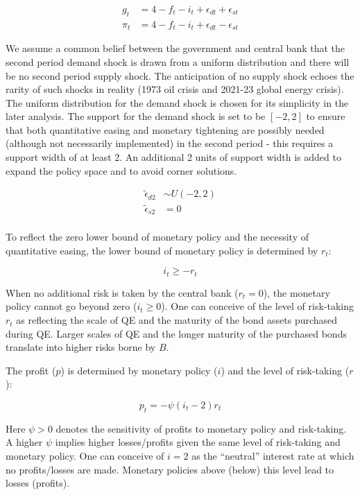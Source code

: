 \documentclass[
  a4paper,
  abstract=true]{scrartcl}
\theoremstyle{definition}
\begin{document}
\begin{align*} g_t &= 4-f_t-i_t+\epsilon_{dt}+\epsilon_{st}\\ \pi_t &= 4-f_t-i_t+\epsilon_{dt}-\epsilon_{st} \end{align*}

We assume a common belief between the government and central bank that
the second period demand shock is drawn from a uniform distribution and
there will be no second period supply shock. The anticipation of no
supply shock echoes the rarity of such shocks in reality (1973 oil
crisis and 2021-23 global energy crisis). The uniform distribution for
the demand shock is chosen for its simplicity in the later analysis. The
support for the demand shock is set to be \([-2,2]\) to ensure that both
quantitative easing and monetary tightening are possibly needed
(although not necessarily implemented) in the second period - this
requires a support width of at least 2. An additional 2 units of support
width is added to expand the policy space and to avoid corner solutions.

\begin{align*}
\tilde\epsilon_{d2} &\sim U(-2, 2) \\
\tilde\epsilon_{s2}&=0 \\
\end{align*}

To reflect the zero lower bound of monetary policy and the necessity of
quantitative easing, the lower bound of monetary policy is determined by
\(r_t\):

\[
i_t\geq-r_t
\]

When no additional risk is taken by the central bank (\(r_t=0\)), the
monetary policy cannot go beyond zero (\(i_t\geq0\)). One can conceive
of the level of risk-taking \(r_t\) as reflecting the scale of QE and
the maturity of the bond assets purchased during QE. Larger scales of QE
and the longer maturity of the purchased bonds translate into higher
risks borne by \(B\).

The profit (\(p\)) is determined by monetary policy (\(i\)) and the
level of risk-taking (\(r\)):

\[
p_t =-\psi(i_t-2)r_t
\]

Here \(\psi>0\) denotes the sensitivity of profits to monetary policy
and risk-taking. A higher \(\psi\) implies higher losses/profits given
the same level of risk-taking and monetary policy. One can conceive of
\(i=2\) as the ``neutral'' interest rate at which no profits/losses are
made. Monetary policies above (below) this level lead to losses
(profits).
\end{document}
